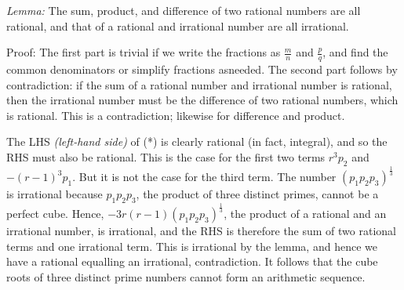 \begin{enumerate}
 \textit{Lemma:} The sum, product, and difference of two rational numbers are all rational, and that of a rational and irrational number are all irrational.

 Proof: The first part is trivial if we write the fractions as $\frac{m}{n}$ and $\frac{p}{q}$, and find the common denominators or simplify fractions asneeded. The second part follows by contradiction: if the sum of a rational number and irrational number is rational, then the irrational number must be the difference of two rational numbers, which is rational. This is a contradiction; likewise for difference and product.

 The LHS \textit{(left-hand side)} of (*) is clearly rational (in fact, integral), and so the RHS must also be rational. This is the case for the first two terms $r^3p_2$ and $-(r-1)^3p_1$. But it is not the case for the third term. The number $(p_1p_2p_3)^\frac{1}{3}$ is irrational because $p_1p_2p_3$, the product of three distinct primes, cannot be a perfect cube. Hence, $-3r(r-1)(p_1p_2p_3)^\frac{1}{3}$, the product of a rational and an irrational number, is irrational, and the RHS is therefore the sum of two rational terms and one irrational term. This is irrational by the lemma, and hence we have a rational equalling an irrational, contradiction. It follows that the cube roots of three distinct prime numbers cannot form an arithmetic sequence.

 


\end{enumerate}